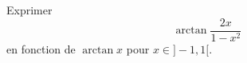 Exprimer 
\begin{displaymath}
 \arctan \frac{2x}{1 - x^2}
\end{displaymath}
en fonction de $\arctan x$ pour $x\in]-1,1[$.
\bigskip